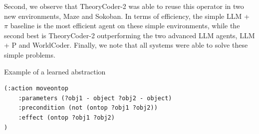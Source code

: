 \documentclass{article}
\theoremstyle{plain}
\theoremstyle{definition}
\theoremstyle{remark}
\begin{document}
Second, we observe that TheoryCoder-2 was able to reuse this operator in two new environments, Maze and Sokoban.
In terms of efficiency, the simple LLM + $\pi$ baseline is the most efficient agent on these simple environments, while the second best is TheoryCoder-2 outperforming the two advanced LLM agents, LLM + P and WorldCoder. Finally, we note that all systems were able to solve these simple problems.


\begin{mybox}[boxrule=0pt, parbox=false, opacityframe=1, colframe=black, label=box:abstraction]{Example of a learned abstraction}
\begin{lstlisting}[basicstyle=\ttfamily\small, breaklines=true]
(:action moveontop
    :parameters (?obj1 - object ?obj2 - object)
    :precondition (not (ontop ?obj1 ?obj2))
    :effect (ontop ?obj1 ?obj2)
)
\end{lstlisting}
\end{mybox}
\end{document}
